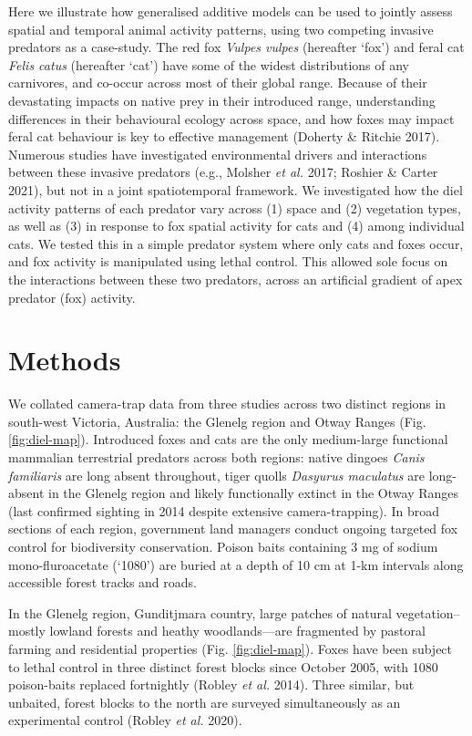 \documentclass[11pt,a4paper,titlepage,twoside,openright]{style/unimelbthesis}
\begin{document}
\begin{mainmatter}
Here we illustrate how generalised additive models can be used to jointly assess spatial and temporal animal activity patterns, using two competing invasive predators as a case-study. The red fox \emph{Vulpes vulpes} (hereafter `fox') and feral cat \emph{Felis catus} (hereafter `cat') have some of the widest distributions of any carnivores, and co-occur across most of their global range. Because of their devastating impacts on native prey in their introduced range, understanding differences in their behavioural ecology across space, and how foxes may impact feral cat behaviour is key to effective management (Doherty \& Ritchie 2017). Numerous studies have investigated environmental drivers and interactions between these invasive predators (e.g., Molsher \emph{et al.} 2017; Roshier \& Carter 2021), but not in a joint spatiotemporal framework. We investigated how the diel activity patterns of each predator vary across (1) space and (2) vegetation types, as well as (3) in response to fox spatial activity for cats and (4) among individual cats. We tested this in a simple predator system where only cats and foxes occur, and fox activity is manipulated using lethal control. This allowed sole focus on the interactions between these two predators, across an artificial gradient of apex predator (fox) activity.

\newpage

\hypertarget{methods-3}{%
\section{Methods}\label{methods-3}}

We collated camera-trap data from three studies across two distinct regions in south-west Victoria, Australia: the Glenelg region and Otway Ranges (Fig. \ref{fig:diel-map}). Introduced foxes and cats are the only medium-large functional mammalian terrestrial predators across both regions: native dingoes \emph{Canis familiaris} are long absent throughout, tiger quolls \emph{Dasyurus maculatus} are long-absent in the Glenelg region and likely functionally extinct in the Otway Ranges (last confirmed sighting in 2014 despite extensive camera-trapping). In broad sections of each region, government land managers conduct ongoing targeted fox control for biodiversity conservation. Poison baits containing 3 mg of sodium mono-fluroacetate (`1080') are buried at a depth of 10 cm at 1-km intervals along accessible forest tracks and roads.

In the Glenelg region, Gunditjmara country, large patches of natural vegetation--mostly lowland forests and heathy woodlands---are fragmented by pastoral farming and residential properties (Fig. \ref{fig:diel-map}). Foxes have been subject to lethal control in three distinct forest blocks since October 2005, with 1080 poison-baits replaced fortnightly (Robley \emph{et al.} 2014). Three similar, but unbaited, forest blocks to the north are surveyed simultaneously as an experimental control (Robley \emph{et al.} 2020).


\end{mainmatter}
\end{document}
